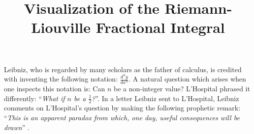 \documentclass{article}
\theoremstyle{theorem}
\theoremstyle{definition}
\begin{document}
\title{Visualization of the Riemann-Liouville Fractional Integral}

\maketitle



\noindent
Leibniz, who is regarded by many scholars as the father of calculus, is credited with inventing the following notation: $\frac{d^n y}{d x^n}$. 
A natural question which arises when one inspects this notation is: Can $n$ be a non-integer value? L'Hospital phrased it differently: ``\emph{What if $n$ be a $\frac{1}{2}$?}''. 
In a letter Leibniz sent to L'Hospital, Leibniz comments on L'Hospital's question by making the following prophetic remark: ``\emph{This is an apparent paradox from which, one day, useful 
consequences will be drawn}'' \cite{ross77,machado14,machado17}.\\
\end{document}
